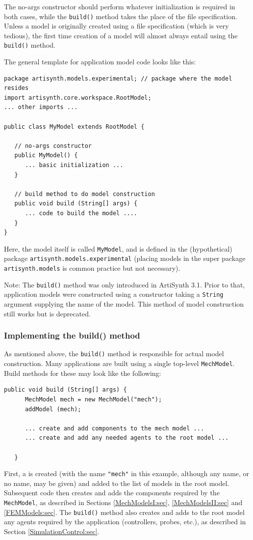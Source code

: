 The no-args constructor should perform whatever initialization is
required in both cases, while the {\tt build()} method takes the place of the
file specification. Unless a model is originally created using a file
specification (which is very tedious), the first time
creation of a model will almost always entail using the {\tt build()}
method.

The general template for application model code looks like this:

\begin{lstlisting}[]
package artisynth.models.experimental; // package where the model resides
import artisynth.core.workspace.RootModel;
... other imports ...

public class MyModel extends RootModel {

   // no-args constructor
   public MyModel() {
      ... basic initialization ...
   }

   // build method to do model construction
   public void build (String[] args) {
      ... code to build the model ....
   }
}
\end{lstlisting}
Here, the model itself is called {\tt MyModel}, and is defined in the
(hypothetical) 
package {\tt artisynth.models.experimental} (placing models in the super
package {\tt artisynth.models} is common practice but not
necessary).

\begin{sideblock}
Note: The {\tt build()} method was only introduced in ArtiSynth
3.1. Prior to that, application models were constructed using a
constructor taking a {\tt String} argument supplying the name of the
model. This method of model construction still works but is
deprecated.
\end{sideblock}

\subsubsection{Implementing the build() method}

As mentioned above, the {\tt build()} method is responsible for actual
model construction.  Many applications are built using a single
top-level {\tt MechModel}.  Build methods for these may look
like the following:
\begin{lstlisting}[]
   public void build (String[] args) {
      MechModel mech = new MechModel("mech");
      addModel (mech);

      ... create and add components to the mech model ...
      ... create and add any needed agents to the root model ...

   }
\end{lstlisting}
First, a  is created
(with the name {\tt "mech"} in this example, although any name, or no
name, may be given) and added to the list of models in the root
model. Subsequent code then creates and adds the components required
by the {\tt MechModel}, as described in Sections
\ref{MechModelsI:sec}, \ref{MechModelsII:sec} and \ref{FEMModels:sec}.
The {\tt build()} method also creates and adds to the root model any
agents required by the application (controllers, probes, etc.), as
described in Section \ref{SimulationControl:sec}.

